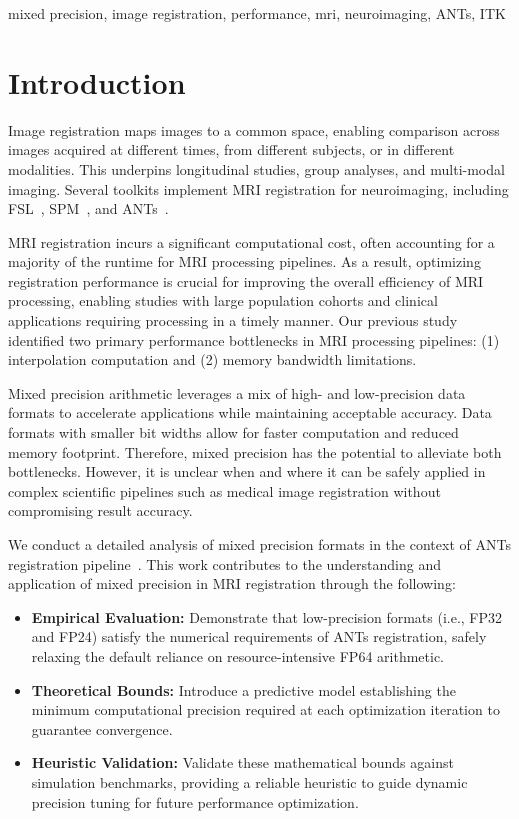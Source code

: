 \documentclass[journal,twoside,web]{ieeecolor}
\begin{document}
\begin{IEEEkeywords}
	mixed precision, image registration, performance, mri, neuroimaging, ANTs, ITK
\end{IEEEkeywords}

\section{Introduction}
\label{sec:introduction}
Image registration maps images to a common space, enabling comparison across images acquired at different times, from different subjects, or in different modalities. This underpins longitudinal studies, group analyses, and multi-modal imaging. Several toolkits implement MRI registration for neuroimaging, including FSL~\cite{Jenkinson2012-tq}, SPM~\cite{Ashburner1997-fh}, and ANTs~\cite{Avants2020-xx}.

MRI registration incurs a significant computational cost, often accounting for a majority of the runtime for MRI processing pipelines. As a result, optimizing registration performance is crucial for improving the overall efficiency of MRI processing, enabling studies with large population cohorts and clinical applications requiring processing in a timely manner. Our previous study~\cite{Dugre2025-fs} identified two primary performance bottlenecks in MRI processing pipelines: (1) interpolation computation and (2) memory bandwidth limitations.

Mixed precision arithmetic leverages a mix of high- and low-precision data formats to accelerate applications while maintaining acceptable accuracy. Data formats with smaller bit widths allow for faster computation and reduced memory footprint. Therefore, mixed precision has the potential to alleviate both bottlenecks. However, it is unclear when and where it can be safely applied in complex scientific pipelines such as medical image registration without compromising result accuracy.

We conduct a detailed analysis of mixed precision formats in the context of ANTs registration pipeline~\cite{Avants2020-xx}. This work contributes to the understanding and application of mixed precision in MRI registration through the following:
\begin{itemize}
	\item \textbf{Empirical Evaluation:} Demonstrate that low-precision formats (i.e., FP32 and FP24) satisfy the numerical requirements of ANTs registration, safely relaxing the default reliance on resource-intensive FP64 arithmetic.
	\item \textbf{Theoretical Bounds:} Introduce a predictive model establishing the minimum computational precision required at each optimization iteration to guarantee convergence.
	\item \textbf{Heuristic Validation:} Validate these mathematical bounds against simulation benchmarks, providing a reliable heuristic to guide dynamic precision tuning for future performance optimization.
\end{itemize}
\end{document}
